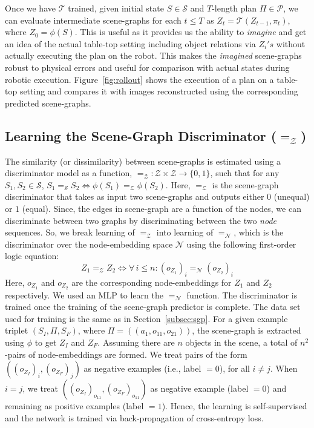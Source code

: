 Once we have $\mathcal{T}$ trained, given initial state $S \in \mathcal{S}$ and $T$-length plan $\Pi \in \mathcal{P}$, we can evaluate intermediate scene-graphs for each $t \leq T$ as $Z_t = \mathcal{T}(Z_{t-1}, \pi_t)$, where $Z_0 = \phi(S)$. This is useful as it provides us the ability to \textit{imagine} and get an idea of the actual table-top setting including object relations via $Z_i's$ without actually executing the plan on the robot. This makes the \textit{imagined} scene-graphs robust to physical errors and useful for comparison with actual states during robotic execution. Figure~\ref{fig:rollout} shows the execution of a plan on a table-top setting and compares it with images reconstructed using the corresponding predicted scene-graphs.

\subsection{Learning the Scene-Graph Discriminator ($=_\mathcal{Z}$)}
\label{subsec:sgd}
The similarity (or dissimilarity) between scene-graphs is estimated using a discriminator model as a function, $=_\mathcal{Z}: \mathcal{Z} \times \mathcal{Z} \rightarrow \{0, 1\}$, such that for any $S_1, S_2 \in \mathcal{S}$, $S_1 =_\mathcal{S} S_2 \iff \phi(S_1) =_\mathcal{Z} \phi(S_2)$. Here, $=_\mathcal{Z}$ is the scene-graph discriminator that takes as input two scene-graphs and outputs either $0$ (unequal) or $1$ (equal). Since, the edges in scene-graph are a function of the nodes, we can discriminate between two graphs by discriminating between the two \textit{node} sequences. So, we break learning of $=_\mathcal{Z}$ into learning of $=_\mathcal{N}$, which is the discriminator over the node-embedding space $\mathcal{N}$ using the following first-order logic equation:
\begin{equation}\label{eqn:esg}
    Z_1 =_\mathcal{Z} Z_2 \iff \forall \, i \leq n : (o_{Z_1})_i =_\mathcal{N} (o_{Z_2})_i
\end{equation}
Here, $o_{Z_1}$ and $o_{Z_2}$ are the corresponding node-embeddings for $Z_1$ and $Z_2$ respectively. We used an MLP to learn the $=_\mathcal{N}$ function. The discriminator is trained once the training of the scene-graph predictor is complete. The data set used for training is the same as in Section~\ref{subsec:sgp}. For a given example triplet $(S_I, \Pi, S_F)$, where $\Pi = ((a_1, o_{11}, o_{21}))$, the scene-graph is extracted using $\phi$ to get $Z_I$ and $Z_F$. Assuming there are $n$ objects in the scene, a total of $n^2$-pairs of node-embeddings are formed. We treat pairs of the form $((o_{Z_I})_i, (o_{Z_F})_j)$ as negative examples (i.e., label $= 0$), for all $i \neq j$. When $i = j$, we treat $((o_{Z_I})_{o_{11}}, (o_{Z_F})_{o_{11}})$ as negative example (label $= 0$) and remaining as positive examples (label $= 1$). Hence, the learning is self-supervised and the network is trained via back-propagation of cross-entropy loss.


